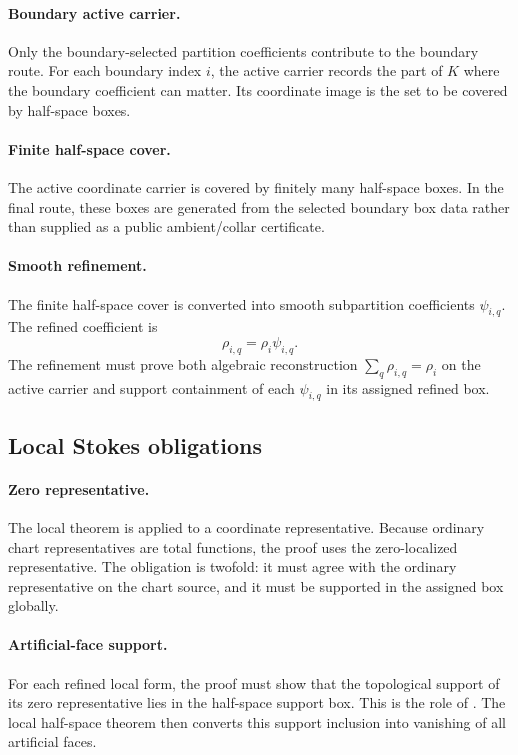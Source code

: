 \paragraph{Boundary active carrier.}
Only the boundary-selected partition coefficients contribute to the boundary
route.  For each boundary index \(i\), the active carrier records the part of
\(K\) where the boundary coefficient can matter.  Its coordinate image is the
set to be covered by half-space boxes.

\paragraph{Finite half-space cover.}
The active coordinate carrier is covered by finitely many half-space boxes.
In the final route, these boxes are generated from the selected boundary box
data rather than supplied as a public ambient/collar certificate.

\paragraph{Smooth refinement.}
The finite half-space cover is converted into smooth subpartition
coefficients \(\psi_{i,q}\).  The refined coefficient is
\[
  \rho_{i,q}=\rho_i\psi_{i,q}.
\]
The refinement must prove both algebraic reconstruction
\(\sum_q\rho_{i,q}=\rho_i\) on the active carrier and support containment of
each \(\psi_{i,q}\) in its assigned refined box.

\subsection{Local Stokes obligations}

\paragraph{Zero representative.}
The local theorem is applied to a coordinate representative.  Because ordinary
chart representatives are total functions, the proof uses the zero-localized
representative.  The obligation is twofold: it must agree with the ordinary
representative on the chart source, and it must be supported in the assigned
box globally.

\paragraph{Artificial-face support.}
For each refined local form, the proof must show that the topological support
of its zero representative lies in the half-space support box.  This is the
role of .  The local half-space
theorem then converts this support inclusion into vanishing of all artificial
faces.

